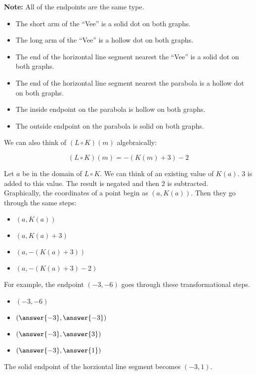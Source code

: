\documentclass{ximera}
\begin{document}
\textbf{Note:} All of the endpoints are the same type.  

\begin{itemize}
\item The short arm of the ``Vee'' is a solid dot on both graphs.
\item The long arm of the ``Vee'' is a hollow dot on both graphs.
\item The end of the horizontal line segment nearest the ``Vee'' is a solid dot on both graphs.
\item The end of the horizontal line segment nearest the parabola is a hollow dot on both graphs.
\item The inside endpoint on the parabola is hollow on both graphs.
\item The outside endpoint on the parabola is solid on both graphs.
\end{itemize}



We can also think of $(L \circ K)(m)$ algebraically:


\[
(L \circ K)(m) = -(K(m)+3) - 2
\]


Let $a$ be in the domain of $L \circ K$. We can think of an existing value of $K(a)$.  $3$ is added to this value. The result is negated and then $2$ is subtracted. \\

Graphically, the coordinates of a point begin as $(a, K(a))$.  Then they go through the same steps: 


\begin{itemize}
\item $(a, K(a))$
\item $(a, K(a) + 3)$
\item $(a, -(K(a) + 3))$
\item $(a, -(K(a) + 3) - 2)$
\end{itemize}



\begin{procedure}
For example, the endpoint $(-3, -6)$ goes through these transformational steps.

\begin{itemize}
\item $(-3, -6)$
\item $\left( \answer{-3},  \answer{-3} \right)$
\item $\left( \answer{-3},  \answer{3} \right)$
\item $\left( \answer{-3},  \answer{1} \right)$
\end{itemize}

The solid endpoint of the horziontal line segment becomes $(-3, 1)$.
\end{procedure}
\end{document}
